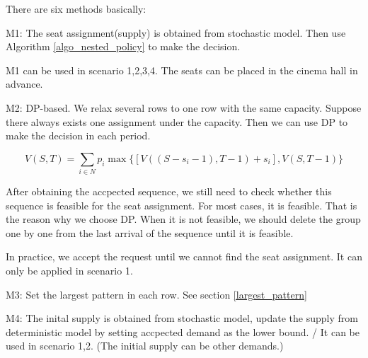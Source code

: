 There are six methods basically:

M1: The seat assignment(supply) is obtained from stochastic model. Then use Algorithm \ref{algo_nested_policy} to make the decision.

M1 can be used in scenario 1,2,3,4. The seats can be placed in the cinema hall in advance.

M2: DP-based. We relax several rows to one row with the same capacity. Suppose there always exists one assignment under the capacity. Then we can use DP to make the decision in each period.

$$V(S,T) = \sum_{i \in N} p_i \max\{ {[V((S-s_i-1),T-1)+ s_i]}, {V(S,T-1)}\}$$

After obtaining the accpected sequence, we still need to check whether this sequence is feasible for the seat assignment. For most cases, it is feasible. That is the reason why we choose DP. When it is not feasible, we should delete the group one by one from the last arrival of the sequence until it is feasible.

In practice, we accept the request until we cannot find the seat assignment. It can only be applied in scenario 1.






M3: Set the largest pattern in each row. See section \ref{largest_pattern}

M4: 
The inital supply is obtained from stochastic model, update the supply from deterministic model by setting accpected demand as the lower bound. / It can be used in scenario 1,2. (The initial supply can be other demands.)


